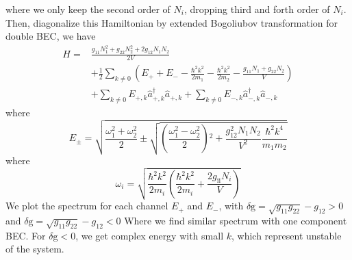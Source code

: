 where we only keep the second order of $N_i$, dropping third and forth order of $N_i$. Then, diagonalize this Hamiltonian by extended Bogoliubov transformation for double BEC, we have
\begin{equation}
\begin{split}
H=&\frac{g_{11}N_1^2+g_{22}N_2^2+2g_{12}N_1N_2}{2V}\\
&+\frac{1}{2}\sum _{k\neq 0} \left(E_++E_--\frac{\hbar ^2k^2}{2m_1}-\frac{\hbar ^2k^2}{2m_2}-\frac{g_{11}N_1+g_{22}N_2}{V}\right)\\
&+\sum_{k\neq 0} E_{+,k}\hat{a}_{+,k}^\dagger\hat{a}_{+,k}+\sum _{k\neq 0} E_{-,k}\hat{a}_{-,k}^\dagger\hat{a}_{-,k}
\end{split}
\end{equation}
where
\begin{equation}
E_{\pm }=\sqrt{\frac{\omega _1^2+\omega _2^2}{2}\pm \sqrt{\left(\frac{\omega _1^2-\omega _2^2}{2}\right){}^2+\frac{g_{12}^2N_1N_2}{V^2}\frac{\hbar
^2k^4}{m_1m_2}}}
\end{equation}
where
\begin{equation}
\omega _i=\sqrt{\frac{\hbar ^2k^2}{2m_i}\left(\frac{\hbar ^2k^2}{2m_i}+\frac{2g_{\text{ii}}N_i}{V}\right)}
\end{equation}
We plot the spectrum for each channel $E_+$ and $E_-$, with $\text{$\delta $g}=\sqrt{g_{11}g_{22}}-g_{12}>0$ and $\text{$\delta $g}=\sqrt{g_{11}g_{22}}-g_{12}<0$
Where we find similar spectrum with one component BEC. For $\text{$\delta $g}<0$, we get complex energy with small $k$, which represent unstable of the system.

